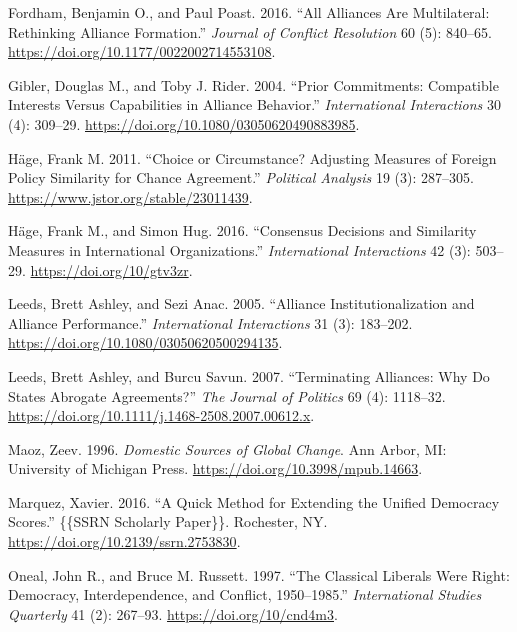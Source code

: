 \documentclass[
  letterpaper,
  DIV=11,
  numbers=noendperiod]{scrartcl}
\newlength{\cslhangindent}
\newenvironment{CSLReferences}[2] %
 {\begin{list}{}{%
  \setlength{\itemindent}{0pt}
  \setlength{\leftmargin}{0pt}
  \setlength{\parsep}{0pt}
  \ifodd #1
   \setlength{\leftmargin}{\cslhangindent}
   \setlength{\itemindent}{-1\cslhangindent}
  \fi
  \setlength{\itemsep}{#2\baselineskip}}}
 {\end{list}}
\begin{document}
\begin{CSLReferences}{1}{0}
Fordham, Benjamin O., and Paul Poast. 2016. {``All {Alliances Are
Multilateral}: {Rethinking Alliance Formation}.''} \emph{Journal of
Conflict Resolution} 60 (5): 840--65.
\url{https://doi.org/10.1177/0022002714553108}.

Gibler, Douglas M., and Toby J. Rider. 2004. {``Prior {Commitments}:
{Compatible Interests} Versus {Capabilities} in {Alliance Behavior}.''}
\emph{International Interactions} 30 (4): 309--29.
\url{https://doi.org/10.1080/03050620490883985}.

Häge, Frank M. 2011. {``Choice or {Circumstance}? {Adjusting Measures}
of {Foreign Policy Similarity} for {Chance Agreement}.''}
\emph{Political Analysis} 19 (3): 287--305.
\url{https://www.jstor.org/stable/23011439}.

Häge, Frank M., and Simon Hug. 2016. {``Consensus {Decisions} and
{Similarity Measures} in {International Organizations}.''}
\emph{International Interactions} 42 (3): 503--29.
\url{https://doi.org/10/gtv3zr}.

Leeds, Brett Ashley, and Sezi Anac. 2005. {``Alliance
{Institutionalization} and {Alliance Performance}.''}
\emph{International Interactions} 31 (3): 183--202.
\url{https://doi.org/10.1080/03050620500294135}.

Leeds, Brett Ashley, and Burcu Savun. 2007. {``Terminating {Alliances}:
{Why Do States Abrogate Agreements}?''} \emph{The Journal of Politics}
69 (4): 1118--32.
\url{https://doi.org/10.1111/j.1468-2508.2007.00612.x}.

Maoz, Zeev. 1996. \emph{Domestic {Sources} of {Global Change}}. Ann
Arbor, MI: University of Michigan Press.
\url{https://doi.org/10.3998/mpub.14663}.

Marquez, Xavier. 2016. {``A {Quick Method} for {Extending} the {Unified
Democracy Scores}.''} \{\{SSRN Scholarly Paper\}\}. Rochester, NY.
\url{https://doi.org/10.2139/ssrn.2753830}.

Oneal, John R., and Bruce M. Russett. 1997. {``The {Classical Liberals
Were Right}: {Democracy}, {Interdependence}, and {Conflict},
1950--1985.''} \emph{International Studies Quarterly} 41 (2): 267--93.
\url{https://doi.org/10/cnd4m3}.


\end{CSLReferences}
\end{document}
